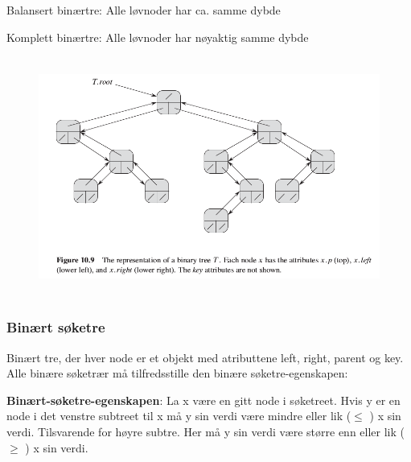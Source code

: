 \documentclass[12pt]{report}
\begin{document}
Balansert binærtre: Alle løvnoder har ca. samme dybde \par

Komplett binærtre: Alle løvnoder har nøyaktig samme dybde\par


\vspace{\baselineskip}



\begin{figure}[H]
	\begin{Center}
		\includegraphics[width=5.17in,height=3.1in]{./media/image75.png}
	\end{Center}
\end{figure}



\par


\vspace{\baselineskip}
\subsubsection*{Binært søketre}
Binært tre, der hver node er et objekt med atributtene left, right, parent og key. Alle binære søketrær må tilfredsstille den binære søketre-egenskapen:\par

\textbf{Binært-søketre-egenskapen}: La x være en gitt node i søketreet. Hvis y er en node i det venstre subtreet til x må y sin verdi være mindre eller lik ($ \leq $ ) x sin verdi. Tilsvarende for høyre subtre. Her må y sin verdi være større enn eller lik ($ \geq $ ) x sin verdi.\par
\end{document}
